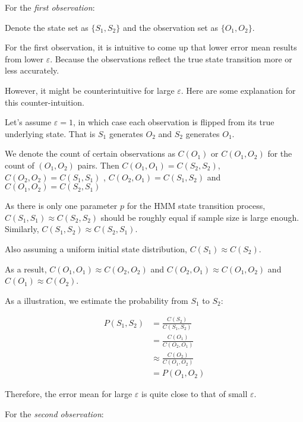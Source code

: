 \documentclass[paper=a4, fontsize=11pt]{scrartcl} %
\numberwithin{equation}{section} %
\numberwithin{figure}{section} %
\numberwithin{table}{section} %
\begin{document}
For the {\em first observation}:\newline

Denote the state set as $\{S_1, S_2\}$ and the observation set as $\{O_1, O_2\}$. \newline

For the first observation, it is intuitive to come up that lower error mean results from lower $\varepsilon$. Because the observations reflect the true state transition more or less accurately. 

However, it might be counterintuitive for large $\varepsilon$. Here are some explanation for this counter-intuition. \newline

Let's assume $\varepsilon=1$, in which case each observation is flipped from its true underlying state. That is $S_1$ generates $O_2$ and $S_2$ generates $O_1$. 

We denote the count of certain observations as $C (O_1)$ or $C (O_1, O_2)$ for the count of $(O_1, O_2)$ pairs. Then $C (O_1, O_1) = C (S_2, S_2)$, $C (O_2, O_2) = C (S_1, S_1)$ , $C (O_2, O_1) = C (S_1, S_2)$ and $C (O_1, O_2) = C (S_2, S_1)$ 

As there is only one parameter $p$ for the HMM state transition process, $C(S_1,S_1) \approx C(S_2,S_2)$ should be roughly equal if sample size is large enough. Similarly, $C(S_1, S_2) \approx C(S_2, S_1)$. 

Also assuming a uniform initial state distribution, $C (S_1) \approx C (S_2)$. \newline

As a result, $C (O_1, O_1) \approx C (O_2, O_2)$ and $C (O_2, O_1) \approx C (O_1, O_2)$ and $C (O_1) \approx C (O_2)$. 

As a illustration, we estimate the probability from $S_1$ to $S_2$:

\begin {align*}
  P (S_1, S_2) &= \frac {C (S_2)} {C (S_1, S_2)} \\
  &= \frac {C (O_1)} {C (O_2, O_1)} \\
  &\approx \frac {C (O_2)} {C (O_1, O_2)}\\
  &=P (O_1, O_2)
\end {align*}

Therefore, the error mean for large $\varepsilon$ is quite close to that of small $\varepsilon$.\newline

For the {\em second observation}:\newline
\end{document}
